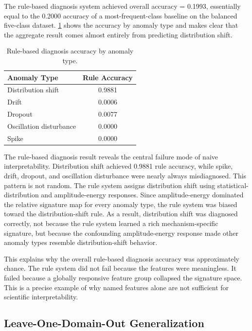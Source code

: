 The rule-based diagnosis system achieved overall accuracy = 0.1993, essentially equal to the 0.2000 accuracy of a most-frequent-class baseline on the balanced five-class dataset. \cref{tab:rule-diagnosis} shows the accuracy by anomaly type and makes clear that the aggregate result comes almost entirely from predicting distribution shift.

\begin{table}[htbp]
\centering
\caption{Rule-based diagnosis accuracy by anomaly type.}
\label{tab:rule-diagnosis}
\begin{tabular}{lc}
\toprule
\textbf{Anomaly Type} & \textbf{Rule Accuracy} \\
\midrule
Distribution shift & 0.9881 \\
Drift & 0.0006 \\
Dropout & 0.0077 \\
Oscillation disturbance & 0.0000 \\
Spike & 0.0000 \\
\bottomrule
\end{tabular}
\end{table}

The rule-based diagnosis result reveals the central failure mode of naive interpretability. Distribution shift achieved 0.9881 rule accuracy, while spike, drift, dropout, and oscillation disturbance were nearly always misdiagnosed. This pattern is not random. The rule system assigns distribution shift using statistical-distribution and amplitude-energy responses. Since amplitude-energy dominated the relative signature map for every anomaly type, the rule system was biased toward the distribution-shift rule. As a result, distribution shift was diagnosed correctly, not because the rule system learned a rich mechanism-specific signature, but because the confounding amplitude-energy response made other anomaly types resemble distribution-shift behavior.

This explains why the overall rule-based diagnosis accuracy was approximately chance. The rule system did not fail because the features were meaningless. It failed because a globally responsive feature group collapsed the signature space. This is a precise example of why named features alone are not sufficient for scientific interpretability.

\subsection{Leave-One-Domain-Out Generalization}

